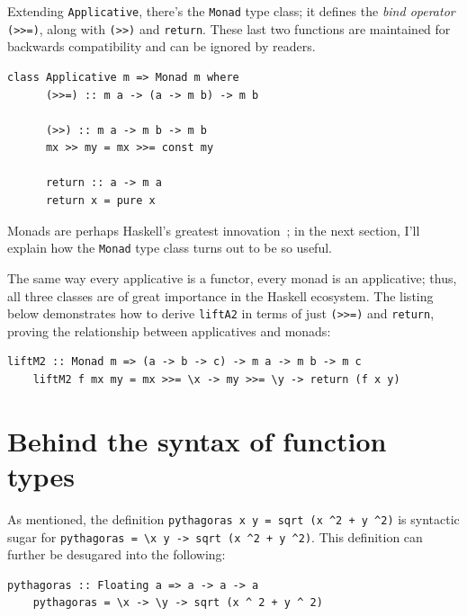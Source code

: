 \documentclass[UdineBachThesis,american,11pt]{PhdThesis}
\begin{document}
  Extending \mbox{\texttt{Applicative}}, there's the \mbox{\texttt{Monad}} type
  class; it defines the \emph{bind operator} \mbox{\texttt{(>>=)}}, along with
  \mbox{\texttt{(>>)}} and \mbox{\texttt{return}}. These last two functions are
  maintained for backwards compatibility and can be ignored by readers.

  \begin{Verbatim}[gobble=4,fontsize=\small]
    class Applicative m => Monad m where
      (>>=) :: m a -> (a -> m b) -> m b

      (>>) :: m a -> m b -> m b
      mx >> my = mx >>= const my

      return :: a -> m a
      return x = pure x
  \end{Verbatim}

  Monads are perhaps Haskell's greatest
  innovation~\cite{monads-for-functional-programming}; in the next section, I'll
  explain how the \mbox{\texttt{Monad}} type class turns out to be so useful.

  The same way every applicative is a functor, every monad is an applicative;
  thus, all three classes are of great importance in the Haskell ecosystem. The
  listing below demonstrates how to derive \mbox{\texttt{liftA2}} in terms of
  just \mbox{\texttt{(>>=)}} and \mbox{\texttt{return}}, proving the
  relationship between applicatives and monads:

  \begin{Verbatim}[gobble=4,fontsize=\small]
    liftM2 :: Monad m => (a -> b -> c) -> m a -> m b -> m c
    liftM2 f mx my = mx >>= \x -> my >>= \y -> return (f x y)
  \end{Verbatim}

  \newpage

  \section{Behind the syntax of function types}

  As mentioned, the definition
  \mbox{\texttt{pythagoras x y = sqrt (x \textasciicircum 2 + y \textasciicircum 2)}}
  is syntactic sugar for
  \mbox{\texttt{pythagoras = \textbackslash x y -> sqrt (x \textasciicircum 2 + y \textasciicircum 2)}}.
  This definition can further be desugared into the following:

  \begin{Verbatim}[gobble=4,fontsize=\small]
    pythagoras :: Floating a => a -> a -> a
    pythagoras = \x -> \y -> sqrt (x ^ 2 + y ^ 2)
  \end{Verbatim}
\end{document}
